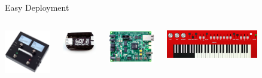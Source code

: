 \begin{frame}[fragile]{Easy Deployment}
\begin{columns}
    \end{columns}

    \begin{columns}
       
        \begin{center}
          \includegraphics[width=2cm,keepaspectratio=true]{images/mod-duo}
        \end{center}

        \begin{center}
          \includegraphics[width=1.5cm,keepaspectratio=true]{images/bela-mini}
        \end{center}

        \begin{center}
          \includegraphics[width=2cm,keepaspectratio=true]{images/sam-board}
        \end{center}

        \begin{center}
        \href{http://foo-yc20.codeforcode.com}{\includegraphics[width=4cm,keepaspectratio=true]{images/yc20web}}
    \end{center}
\end{columns}

\end{frame}




